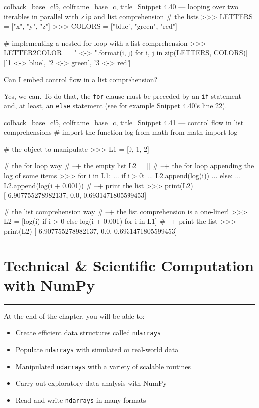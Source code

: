 \documentclass[a4paper,11pt]{book}
\newcommand{\question}[1]{%
    \begin{tcolorbox}[colback=comp_c!10,colframe=comp_c,sidebyside align=top,width=\linewidth,before skip=1ex]
        #1
    \end{tcolorbox}
    \switchcolumn%
}
\newcommand{\note}[1]{%
    \begin{tcolorbox}[colback=white!0,colframe=white!10,width=\linewidth,before skip=1ex]
        #1
    \end{tcolorbox}
}
\begin{document}
\begin{pythoncode}[linenos=true,]{colback=base_c!5, colframe=base_c, title=\sffamily Snippet 4.40 ---  looping over two iterables in parallel with \texttt{zip} and list comprehension}
# the lists 
>>> LETTERS = ["x", "y", "z"]
>>> COLORS = ["blue", "green", "red"]

# implementing a nested for loop with a list comprehension
>>> LETTER2COLOR = ["{} <-> {}".format(i, j) for i, j in zip(LETTERS, COLORS)]
['1 <-> blue', '2 <-> green', '3 <-> red']
\end{pythoncode}

\begin{paracol}{2}
	\question{\raggedright Can I embed control flow in a list comprehension?}
	\note{Yes, we can. To do that, the \texttt{for} clause must be preceded by an \texttt{if} statement and, at least, an \texttt{else} statement (see for example Snippet 4.40's line 22). }
\end{paracol}

\begin{pythoncode}[linenos=true,]{colback=base_c!5, colframe=base_c, title=\sffamily Snippet 4.41 --- control flow in list comprehensions}
# import the function log from math 
from math import log

# the object to manipulate
>>> L1 = [0, 1, 2]

# the for loop way
# --+ the empty list 
L2 = []
# --+ the for loop appending the log of some items
>>> for i in L1:
...     if i > 0:
...         L2.append(log(i))
...     else:
...         L2.append(log(i + 0.001))
# --+ print the list
>>> print(L2)
[-6.907755278982137, 0.0, 0.6931471805599453]

# the list comprehension way
# --+ the list comprehension is a one-liner!
>>> L2 = [log(i) if i > 0 else log(i + 0.001) for i in L1]
# --+ print the list
>>> print(L2)
[-6.907755278982137, 0.0, 0.6931471805599453]
\end{pythoncode}

\theendnotes

\chapter{Technical \& Scientific Computation with NumPy}
\label{ch:tech_sci_computation}

\par\noindent\rule{\textwidth}{0.4pt}

At the end of the chapter, you will be able to:
\begin{itemize}
	\item Create efficient data structures called \texttt{ndarrays}
	\item Populate \texttt{ndarrays} with simulated or real-world data
	\item Manipulated \texttt{ndarrays} with a variety of scalable routines
	\item Carry out exploratory data analysis with NumPy
	\item Read and write \texttt{ndarrays} in many formats
\end{itemize}
\end{document}
